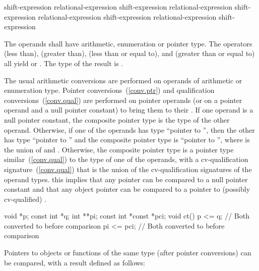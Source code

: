 %
%
%
%
%
%
%
%
%
\begin{bnf}
\br
    shift-expression\br
    relational-expression \terminal{<} shift-expression\br
    relational-expression \terminal{>} shift-expression\br
    relational-expression \terminal{<=} shift-expression\br
    relational-expression \terminal{>=} shift-expression
\end{bnf}

The operands shall have arithmetic, enumeration or pointer type. The
operators \tcode{<} (less than), \tcode{>} (greater than), \tcode{<=}
(less than or equal to), and \tcode{>=} (greater than or equal to) all
yield  or . The type of the result is
.

\pnum
The usual arithmetic conversions are performed on operands of arithmetic
or enumeration type. Pointer conversions~(\ref{conv.ptr}) and
qualification conversions~(\ref{conv.qual}) are performed on pointer
operands (or on a pointer operand and a null pointer constant) to bring
them to their . If one operand is a
null pointer constant, the composite pointer type is the type of the
other operand. Otherwise, if one of the operands has type ``pointer to
 '', then the other has type ``pointer to
 '' and the composite pointer type is ``pointer to
 '', where  is the union of
 and . Otherwise, the composite pointer type is
a pointer type similar~(\ref{conv.qual}) to the type of one of the
operands, with a cv-qualification signature~(\ref{conv.qual}) that is
the union of the cv-qualification signatures of the operand types.
\enternote 
{}%
this implies
that any pointer can be compared to a null pointer constant and that any
object pointer can be compared to a pointer to (possibly cv-qualified)
.
\exitnote 
\enterexample 

\begin{codeblock}
void *p;
const int *q;
int **pi;
const int *const *pci;
void ct()
{
    p <= q;			// Both converted to  before comparison
    pi <= pci;			// Both converted to  before comparison
}
\end{codeblock}
\exitexampleb
{}%
%
Pointers to objects or functions of the same type (after pointer
conversions) can be compared, with a result defined as follows:

